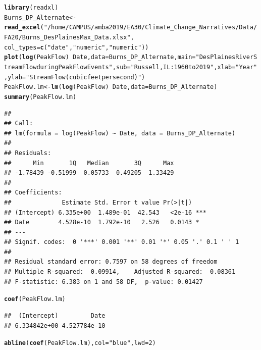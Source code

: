 \documentclass{article}\usepackage[]{graphicx}\usepackage[]{color}
\makeatletter
\newcommand{\hlnum}[1]{\textcolor[rgb]{0.686,0.059,0.569}{#1}}%
\newcommand{\hlstr}[1]{\textcolor[rgb]{0.192,0.494,0.8}{#1}}%
\newcommand{\hlopt}[1]{\textcolor[rgb]{0,0,0}{#1}}%
\newcommand{\hlstd}[1]{\textcolor[rgb]{0.345,0.345,0.345}{#1}}%
\newcommand{\hlkwb}[1]{\textcolor[rgb]{0.69,0.353,0.396}{#1}}%
\newcommand{\hlkwc}[1]{\textcolor[rgb]{0.333,0.667,0.333}{#1}}%
\newcommand{\hlkwd}[1]{\textcolor[rgb]{0.737,0.353,0.396}{\textbf{#1}}}%
\newenvironment{kframe}{%
 \def\at@end@of@kframe{}%
 \ifinner\ifhmode%
  \def\at@end@of@kframe{\end{minipage}}%
  \begin{minipage}{\columnwidth}%
 \fi\fi%
 \def\FrameCommand##1{\hskip\@totalleftmargin \hskip-\fboxsep
 \colorbox{shadecolor}{##1}\hskip-\fboxsep
     \hskip-\linewidth \hskip-\@totalleftmargin \hskip\columnwidth}%
 \MakeFramed {\advance\hsize-\width
   \@totalleftmargin\z@ \linewidth\hsize
   \@setminipage}}%
 {\par\unskip\endMakeFramed%
 \at@end@of@kframe}
\newenvironment{knitrout}{}{} %
\makeatother
\begin{document}
\begin{knitrout}
\color{fgcolor}\begin{kframe}
\begin{alltt}
\hlkwd{library}\hlstd{(readxl)}
\hlstd{Burns_DP_Alternate} \hlkwb{<-} \hlkwd{read_excel}\hlstd{(}\hlstr{"/home/CAMPUS/amba2019/EA30/Climate_Change_Narratives/Data/FA20/Burns_DesPlainesMax_Data.xlsx"}\hlstd{,}
    \hlkwc{col_types} \hlstd{=} \hlkwd{c}\hlstd{(}\hlstr{"date"}\hlstd{,} \hlstr{"numeric"}\hlstd{,} \hlstr{"numeric"}\hlstd{))}
\hlkwd{plot}\hlstd{(}\hlkwd{log}\hlstd{(PeakFlow)}\hlopt{~}\hlstd{Date,} \hlkwc{data}\hlstd{=Burns_DP_Alternate,} \hlkwc{main}\hlstd{=}\hlstr{"Des Plaines River Stream Flow during Peak Flow Events"}\hlstd{,} \hlkwc{sub}\hlstd{=}\hlstr{"Russell, IL: 1960 to 2019"}\hlstd{,} \hlkwc{xlab} \hlstd{=} \hlstr{"Year"}\hlstd{,} \hlkwc{ylab}\hlstd{=}\hlstr{"Stream Flow (cubic feet per second)"}\hlstd{)}
\hlstd{PeakFlow.lm} \hlkwb{<-} \hlkwd{lm}\hlstd{(}\hlkwd{log}\hlstd{(PeakFlow)}\hlopt{~}\hlstd{Date,} \hlkwc{data}\hlstd{=Burns_DP_Alternate)}
\hlkwd{summary}\hlstd{(PeakFlow.lm)}
\end{alltt}
\begin{verbatim}
## 
## Call:
## lm(formula = log(PeakFlow) ~ Date, data = Burns_DP_Alternate)
## 
## Residuals:
##      Min       1Q   Median       3Q      Max 
## -1.78439 -0.51999  0.05733  0.49205  1.33429 
## 
## Coefficients:
##              Estimate Std. Error t value Pr(>|t|)    
## (Intercept) 6.335e+00  1.489e-01  42.543   <2e-16 ***
## Date        4.528e-10  1.792e-10   2.526   0.0143 *  
## ---
## Signif. codes:  0 '***' 0.001 '**' 0.01 '*' 0.05 '.' 0.1 ' ' 1
## 
## Residual standard error: 0.7597 on 58 degrees of freedom
## Multiple R-squared:  0.09914,	Adjusted R-squared:  0.08361 
## F-statistic: 6.383 on 1 and 58 DF,  p-value: 0.01427
\end{verbatim}
\begin{alltt}
\hlkwd{coef}\hlstd{(PeakFlow.lm)}
\end{alltt}
\begin{verbatim}
##  (Intercept)         Date 
## 6.334842e+00 4.527784e-10
\end{verbatim}
\begin{alltt}
\hlkwd{abline}\hlstd{(}\hlkwd{coef}\hlstd{(PeakFlow.lm),} \hlkwc{col} \hlstd{=} \hlstr{"blue"}\hlstd{,} \hlkwc{lwd}\hlstd{=}\hlnum{2}\hlstd{)}
\end{alltt}
\end{kframe}

\end{knitrout}
\end{document}

